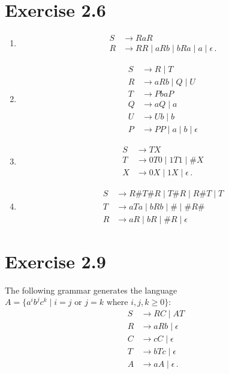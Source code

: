 \documentclass{abrice}
\begin{document}
\section{Exercise 2.6}
\begin{enumerate}[label=\textbf{\alph*)}]
\item
  \begin{align*}
    S &\rightarrow RaR \\
    R &\rightarrow RR \mid aRb \mid bRa \mid a \mid \epsilon\, .
  \end{align*}
\item
  \begin{align*}
    S &\rightarrow R \mid T \\
    R &\rightarrow aRb \mid Q \mid U \\
    T &\rightarrow PbaP \\
    Q &\rightarrow aQ \mid a \\
    U &\rightarrow Ub \mid b \\
    P &\rightarrow PP \mid a \mid b \mid \epsilon
  \end{align*}
\item
  \begin{align*}
    S &\rightarrow TX \\
    T &\rightarrow 0T0 \mid 1T1 \mid \#X \\
    X &\rightarrow 0X \mid 1X \mid \epsilon\, .
  \end{align*}
\item
  \begin{align*}
    S &\rightarrow R \# T \# R \mid T \# R \mid R \# T \mid T \\
    T &\rightarrow aTa \mid bRb \mid \# \mid \# R \# \\
    R &\rightarrow a R \mid b R \mid \# R \mid \epsilon
  \end{align*}
\end{enumerate}

\section{Exercise 2.9}

The following grammar generates the language $A = \{a^i b^j c^k
\mid i = j \text{ or } j = k \text{ where } i,j,k \geq 0 \}$:
\begin{align*}
  S &\rightarrow R C \mid A T \\
  R &\rightarrow a R b \mid \epsilon \\
  C &\rightarrow c C \mid \epsilon \\
  T &\rightarrow b T c \mid \epsilon \\
  A &\rightarrow a A \mid \epsilon\, .
\end{align*}
\end{document}
